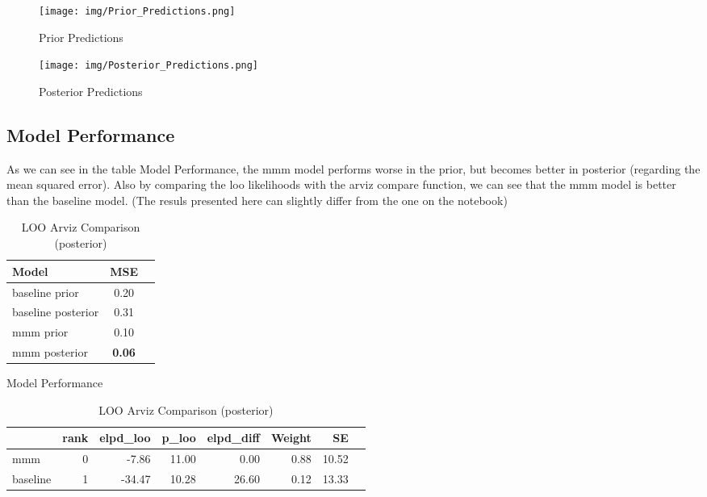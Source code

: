 \documentclass{article}
\begin{document}
\begin{figure}[H] %
    \centering
    \begin{minipage}[t]{0.48\textwidth}
        \centering
        \texttt{[image: img/Prior\_Predictions.png]}
        \caption{Prior Predictions}
        \label{fig:prior_predictions}
    \end{minipage}
    \hfill %
    \begin{minipage}[t]{0.48\textwidth}
        \centering
        \texttt{[image: img/Posterior\_Predictions.png]}
        \caption{Posterior Predictions}
        \label{fig:posterior_predictions}
    \end{minipage}
\end{figure}

\subsection{Model Performance}

As we can see in the table Model Performance, the mmm model performs worse in the prior, but becomes better in posterior (regarding the mean squared error).
Also by comparing the loo likelihoods with the arviz compare function, we can see that the mmm model is better than the baseline model. 
(The resuls presented here can slightly differ from the one on the notebook)
\begin{table}[h!]
    \small
    \centering
    \begin{minipage}[t]{0.3\textwidth}
        \centering
        \begin{tabular}{lcc}
        \toprule
        \textbf{Model} & \textbf{MSE} \\
        \midrule
        baseline prior   & 0.20 \\
        baseline posterior   & 0.31 \\
        mmm prior  & 0.10 \\
        mmm posterior  & \textbf{0.06} \\
        \bottomrule
        \end{tabular}
        \caption{Model Performance}
        \label{tab:model_performance}
    \end{minipage}
    \hfill %
    \begin{minipage}[t]{0.65\textwidth}
        \centering
        \begin{tabular}{lrrrrrrr}
            \toprule
            & \textbf{rank} & \textbf{elpd\_loo} & \textbf{p\_loo} & \textbf{elpd\_diff} & \textbf{Weight} & \textbf{SE} \\
            \midrule
            mmm & 0 & -7.86 & 11.00 & 0.00 & 0.88 & 10.52 \\
            baseline & 1 & -34.47 & 10.28 & 26.60 & 0.12 & 13.33 \\
            \bottomrule
        \end{tabular}
        \caption{LOO Arviz Comparison (posterior)}
        \label{tab:loo_arviz_comparison}
    \end{minipage}
\end{table}
\end{document}

